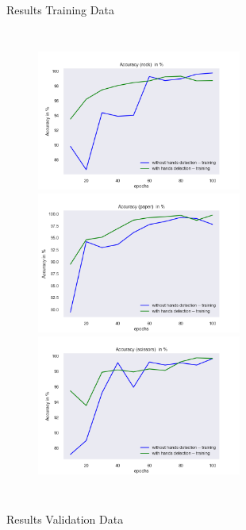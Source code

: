 \documentclass[aspectratio=169]{beamer}
\begin{document}
{\begin{frame}{Results Training Data}
\begin{columns}
    \begin{figure}
        \centering
        \includegraphics[width=0.6\textwidth]{img/experiment/model_comp_10steps__training_acc_rock.png}     
        \includegraphics[width=0.6\textwidth]{img/experiment/model_comp_10steps__training_acc_paper.png}
        \includegraphics[width=0.6\textwidth]{img/experiment/model_comp_10steps__training_acc_scissors.png}
    \end{figure}
   
	\end{columns}
	\end{frame}
	
	\begin{frame}{Results Validation Data}
		\begin{columns}


\end{columns}
\end{frame}}
\end{document}
